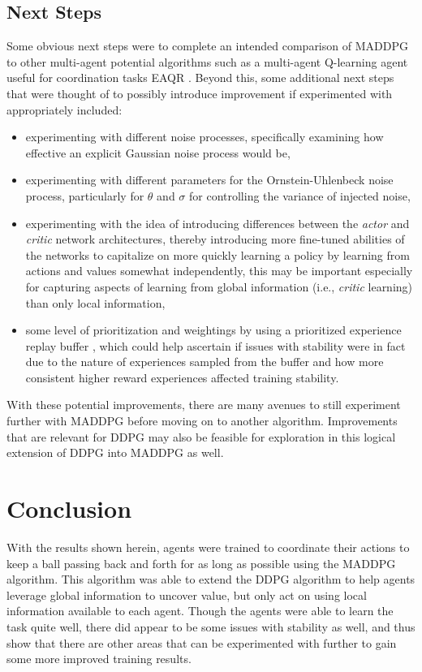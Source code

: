 \documentclass[11pt]{article}
\begin{document}
	\subsection{Next Steps}
	
	Some obvious next steps were to complete an intended comparison of MADDPG to other multi-agent potential algorithms such as a multi-agent Q-learning agent useful for coordination tasks EAQR \cite{eaqr}. Beyond this, some additional next steps that were thought of to possibly introduce improvement if experimented with appropriately included:
	\begin{itemize}
		\item experimenting with different noise processes, specifically examining how effective an explicit Gaussian noise process would be,
		\item experimenting with different parameters for the Ornstein-Uhlenbeck noise process, particularly for $\theta$ and $\sigma$ for controlling the variance of injected noise,
		\item experimenting with the idea of introducing differences between the \textit{actor} and \textit{critic} network architectures, thereby introducing more fine-tuned abilities of the networks to capitalize on more quickly learning a policy by learning from actions and values somewhat independently, this may be important especially for capturing aspects of learning from global information (i.e., \textit{critic} learning) than only local information,
		\item some level of prioritization and weightings by using a prioritized experience replay buffer \cite{prioritized}, which could help ascertain if issues with stability were in fact due to the nature of experiences sampled from the buffer and how more consistent higher reward experiences affected training stability.
	\end{itemize}
	
	With these potential improvements, there are many avenues to still experiment further with MADDPG before moving on to another algorithm. Improvements that are relevant for DDPG may also be feasible for exploration in this logical extension of DDPG into MADDPG as well.
	
	\section{Conclusion}
	
	With the results shown herein, agents were trained to coordinate their actions to keep a ball passing back and forth for as long as possible using the MADDPG algorithm. This algorithm was able to extend the DDPG algorithm to help agents leverage global information to uncover value, but only act on using local information available to each agent. Though the agents were able to learn the task quite well, there did appear to be some issues with stability as well, and thus show that there are other areas that can be experimented with further to gain some more improved training results.
	
	
	
	
\end{document}
